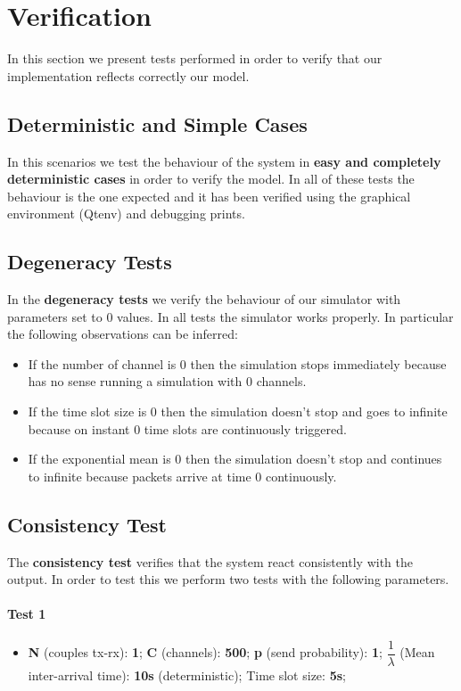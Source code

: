 \section{Verification}
In this section we present tests performed in order to verify that our implementation reflects correctly our model.

\subsection{Deterministic and Simple Cases}
In this scenarios we test the behaviour of the system in \textbf{easy and completely deterministic cases} in order to verify the model. In all of these tests the behaviour is the one expected and it has been verified using the graphical environment (Qtenv) and debugging prints.

\subsection{Degeneracy Tests}
In the \textbf{degeneracy tests} we verify the behaviour of our simulator with parameters set to 0 values. In all tests the simulator works properly. In particular the following observations can be inferred:
\begin{itemize}
	\item If the number of channel is 0 then the simulation stops immediately because has no sense running a simulation with 0 channels.
	\item If the time slot size is 0 then the simulation doesn't stop and goes to infinite because on instant 0  time slots are continuously triggered.
	\item If the exponential mean is 0 then the simulation doesn't stop and continues to infinite because packets arrive at time 0 continuously.
\end{itemize}

\subsection{Consistency Test}
The \textbf{consistency test} verifies that the system react consistently with the output. In order to test this we perform two tests with the following parameters.
\paragraph{Test 1}
\begin{itemize}
	\item \textbf{N} (couples t\textbf{}x-rx): \textbf{1}; \textbf{C} (channels): \textbf{500}; \textbf{p} (send probability): \textbf{1}; $\dfrac{1}{\lambda}$ (Mean inter-arrival time): \textbf{10s} (deterministic); Time slot size: \textbf{5s};
\end{itemize}

